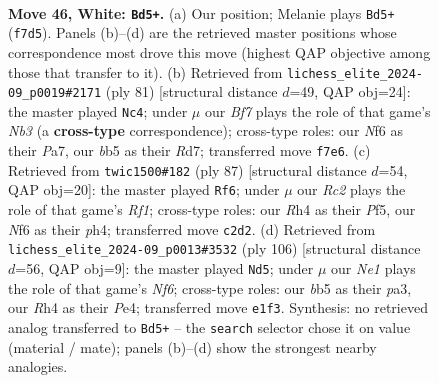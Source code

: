 \documentclass[11pt]{article}
\begin{document}
\clearpage

\begin{figure}[p]\centering
\begin{subfigure}{0.46\textwidth}\centering
\resizebox{\linewidth}{!}{%
\newchessgame
\chessboard[
  setfen={5r2/1k3B2/5N2/1b2rp2/1P5R/8/2R3P1/3KN3 w - - 7 46},
  showmover=false,
  pgfstyle=straightmove, color=movearrow, markmove={f7-d5}
]}
\caption{}
\end{subfigure}\hfill
\begin{subfigure}{0.46\textwidth}\centering
\resizebox{\linewidth}{!}{%
\newchessgame
\chessboard[
  setfen={8/p2r1pk1/1n5p/2P4R/8/4P3/6K1/8 b - - 0 41},
  showmover=false,
  pgfstyle=straightmove, color=movearrow, markmove={b6-c4}
]}
\caption{}
\end{subfigure}
\\[4pt]
\begin{subfigure}{0.46\textwidth}\centering
\resizebox{\linewidth}{!}{%
\newchessgame
\chessboard[
  setfen={5r2/6k1/1R4p1/5p2/7P/5Br1/2K2R2/8 b - - 3 44},
  showmover=false,
  pgfstyle=straightmove, color=movearrow, markmove={f8-f6}
]}
\caption{}
\end{subfigure}\hfill
\begin{subfigure}{0.46\textwidth}\centering
\resizebox{\linewidth}{!}{%
\newchessgame
\chessboard[
  setfen={2kr4/7R/r4N1p/4K1p1/4P3/p4P2/6P1/8 w - - 3 54},
  showmover=false,
  pgfstyle=straightmove, color=movearrow, markmove={f6-d5}
]}
\caption{}
\end{subfigure}
\caption{\textbf{Move 46, White: \texttt{Bd5+}.} (a) Our position; Melanie plays \texttt{Bd5+} (\texttt{f7d5}). Panels (b)--(d) are the retrieved master positions whose correspondence most drove this move (highest QAP objective among those that transfer to it). (b) Retrieved from \texttt{lichess\_elite\_2024-09\_p0019\#2171} (ply 81) [structural distance $d$=49, QAP obj=24]: the master played \texttt{Nc4}; under $\mu$ our \emph{Bf7} plays the role of that game's \emph{Nb3} (a \textbf{cross-type} correspondence); cross-type roles: our \emph{N}f6 as their \emph{P}a7, our \emph{b}b5 as their \emph{R}d7; transferred move \texttt{f7e6}. (c) Retrieved from \texttt{twic1500\#182} (ply 87) [structural distance $d$=54, QAP obj=20]: the master played \texttt{Rf6}; under $\mu$ our \emph{Rc2} plays the role of that game's \emph{Rf1}; cross-type roles: our \emph{R}h4 as their \emph{P}f5, our \emph{N}f6 as their \emph{p}h4; transferred move \texttt{c2d2}. (d) Retrieved from \texttt{lichess\_elite\_2024-09\_p0013\#3532} (ply 106) [structural distance $d$=56, QAP obj=9]: the master played \texttt{Nd5}; under $\mu$ our \emph{Ne1} plays the role of that game's \emph{Nf6}; cross-type roles: our \emph{b}b5 as their \emph{p}a3, our \emph{R}h4 as their \emph{P}e4; transferred move \texttt{e1f3}. Synthesis: no retrieved analog transferred to \texttt{Bd5+} -- the \texttt{search} selector chose it on value (material / mate); panels (b)--(d) show the strongest nearby analogies.}
\label{fig:thought-m90}
\end{figure}
\end{document}
